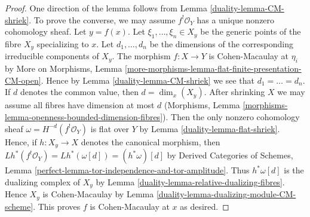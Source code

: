 \begin{proof}

One direction of the lemma follows from Lemma \ref{duality-lemma-CM-shriek}.
To prove the converse, we may assume $f^!\mathcal{O}_Y$ has a unique
nonzero cohomology sheaf. Let $y = f(x)$. Let $\xi_1, \ldots, \xi_n \in X_y$
be the generic points of the fibre $X_y$ specializing to $x$.
Let $d_1, \ldots, d_n$ be the dimensions of the corresponding
irreducible components of $X_y$. The morphism $f : X \to Y$ is Cohen-Macaulay
at $\eta_i$ by More on Morphisms, Lemma
\ref{more-morphisms-lemma-flat-finite-presentation-CM-open}.
Hence by Lemma \ref{duality-lemma-CM-shriek} we see that
$d_1 = \ldots = d_n$. If $d$ denotes the common value, then $d = \dim_x(X_y)$.
After shrinking $X$ we may assume all fibres have dimension at most $d$
(Morphisms, Lemma \ref{morphisms-lemma-openness-bounded-dimension-fibres}).
Then the only nonzero cohomology sheaf $\omega = H^{-d}(f^!\mathcal{O}_Y)$
is flat over $Y$ by Lemma \ref{duality-lemma-flat-shriek}.
Hence, if $h : X_y \to X$ denotes the canonical morphism, then
$Lh^*(f^!\mathcal{O}_Y) = Lh^*(\omega[d]) = (h^*\omega)[d]$
by Derived Categories of Schemes, Lemma
\ref{perfect-lemma-tor-independence-and-tor-amplitude}.
Thus $h^*\omega[d]$ is the dualizing complex of $X_y$ by
Lemma \ref{duality-lemma-relative-dualizing-fibres}.
Hence $X_y$ is Cohen-Macaulay by
Lemma \ref{duality-lemma-dualizing-module-CM-scheme}.
This proves $f$ is Cohen-Macaulay at $x$ as desired.
\end{proof}

